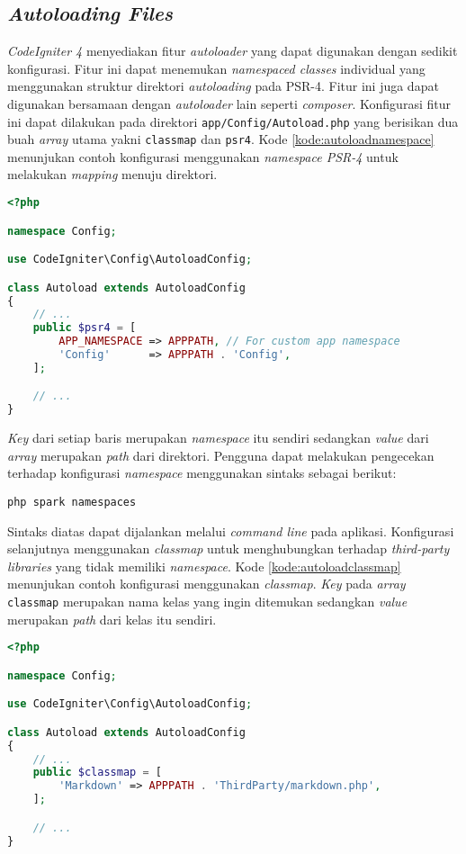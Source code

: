 \subsection{\textit{Autoloading Files}}
\textit{CodeIgniter 4} menyediakan fitur \textit{autoloader} yang dapat digunakan dengan sedikit konfigurasi. Fitur ini dapat menemukan \textit{namespaced classes} individual yang menggunakan struktur direktori \textit{autoloading} pada PSR-4. Fitur ini juga dapat digunakan bersamaan dengan \textit{autoloader} lain seperti \textit{composer}. Konfigurasi fitur ini dapat dilakukan pada direktori \texttt{app/Config/Autoload.php} yang berisikan dua buah \textit{array} utama yakni \texttt{classmap} dan \texttt{psr4}. Kode \ref{kode:autoloadnamespace} menunjukan contoh konfigurasi menggunakan \textit{namespace PSR-4} untuk melakukan \textit{mapping} menuju direktori.
\begin{lstlisting}[language=PHP, caption=Contoh konfigurasi menggunakan \textit{namespace PSR-4}. ,label=kode:autoloadnamespace]
<?php

namespace Config;

use CodeIgniter\Config\AutoloadConfig;

class Autoload extends AutoloadConfig
{
    // ...
    public $psr4 = [
        APP_NAMESPACE => APPPATH, // For custom app namespace
        'Config'      => APPPATH . 'Config',
    ];

    // ...
}
\end{lstlisting}
\textit{Key} dari setiap baris merupakan \textit{namespace} itu sendiri sedangkan \textit{value} dari \textit{array} merupakan \textit{path} dari direktori. Pengguna dapat melakukan pengecekan terhadap konfigurasi \textit{namespace} menggunakan sintaks sebagai berikut:
\begin{center}
	\verb|php spark namespaces|
\end{center}
Sintaks diatas dapat dijalankan melalui \textit{command line} pada aplikasi. Konfigurasi selanjutnya menggunakan \textit{classmap} untuk menghubungkan terhadap \textit{third-party libraries} yang tidak memiliki \textit{namespace}. Kode \ref{kode:autoloadclassmap} menunjukan contoh konfigurasi menggunakan \textit{classmap}. \textit{Key} pada \textit{array} \texttt{classmap} merupakan nama kelas yang ingin ditemukan sedangkan \textit{value} merupakan \textit{path} dari kelas itu sendiri.

\begin{lstlisting}[language=PHP, caption=Contoh konfigurasi menggunakan \textit{classmap}. ,label=kode:autoloadclassmap]
<?php

namespace Config;

use CodeIgniter\Config\AutoloadConfig;

class Autoload extends AutoloadConfig
{
    // ...
    public $classmap = [
        'Markdown' => APPPATH . 'ThirdParty/markdown.php',
    ];

    // ...
}
\end{lstlisting}

